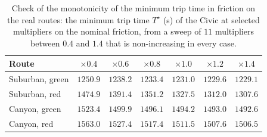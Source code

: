 \begin{table}[htbp]
\centering\small
\setlength{\tabcolsep}{4pt}
\caption{Check of the monotonicity of the minimum trip time in friction on the real routes: the minimum trip time $T^\star$ (s) of the Civic at selected multipliers on the nominal friction, from a sweep of $11$ multipliers between $0.4$ and $1.4$ that is non-increasing in every case.}\label{tab:app-routemono}
\begin{tabular}{lcccccc}
\toprule
Route & $\times0.4$ & $\times0.6$ & $\times0.8$ & $\times1.0$ & $\times1.2$ & $\times1.4$\\
\midrule
Suburban, green & $1250.9$ & $1238.2$ & $1233.4$ & $1231.0$ & $1229.6$ & $1229.1$\\
Suburban, red & $1474.9$ & $1391.4$ & $1351.2$ & $1327.5$ & $1312.0$ & $1307.6$\\
Canyon, green & $1523.4$ & $1499.9$ & $1496.1$ & $1494.2$ & $1493.0$ & $1492.6$\\
Canyon, red & $1563.0$ & $1527.4$ & $1517.4$ & $1511.5$ & $1507.6$ & $1506.5$\\
\bottomrule
\end{tabular}
\end{table}
